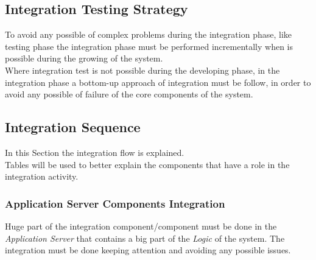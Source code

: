 \subsection{Integration Testing Strategy}
To avoid any possible of complex problems during the integration phase, like testing phase the integration phase must be performed incrementally when is possible during the growing of the system.\\
Where integration test is not possible during the developing phase, in the integration phase a bottom-up approach of integration must be follow, in order to avoid any possible of failure of the core components of the system.

\subsection{Integration Sequence}
In this Section the integration flow is explained.\\
Tables will be used to better explain the components that have a role in the integration activity.

\subsubsection{Application Server Components Integration}\label{appServCompIntRef}
Huge part of the integration component/component must be done in the \textit{Application Server} that contains a big part of the \textit{Logic} of the system. The integration must be done keeping attention and avoiding any possible issues.


